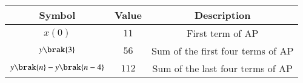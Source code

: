 \footnotesize
\begin{tabular}{|c|c|c|}
\hline
Symbol & Value & Description\\
\hline
$x(0)$ & $11$ & First term of AP \\
\hline
$y\brak{3}$ & $56$ & Sum of the first four terms of AP\\
\hline
$y\brak{n}-y\brak{n-4}$ & $112$& Sum of the last four terms of AP\\
\hline
\end{tabular}
\\
